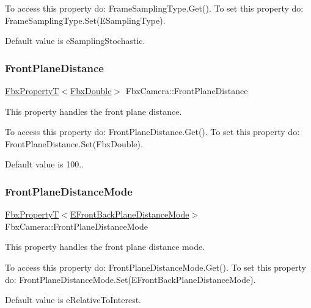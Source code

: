 To access this property do\+: Frame\+Sampling\+Type.\+Get(). To set this property do\+: Frame\+Sampling\+Type.\+Set(\+E\+Sampling\+Type).

Default value is e\+Sampling\+Stochastic. \mbox{\label{class_fbx_camera_ab04e1fdc21ced2af3a372cb3c3c45295}} 
\subsubsection{\texorpdfstring{Front\+Plane\+Distance}{FrontPlaneDistance}}
{\footnotesize\ttfamily \hyperlink{class_fbx_property_t}{Fbx\+PropertyT}$<$\hyperlink{fbxtypes_8h_a171e72a1c46fc15c1a6c9c31948c1c5b}{Fbx\+Double}$>$ Fbx\+Camera\+::\+Front\+Plane\+Distance}

This property handles the front plane distance.

To access this property do\+: Front\+Plane\+Distance.\+Get(). To set this property do\+: Front\+Plane\+Distance.\+Set(\+Fbx\+Double).

Default value is 100.. \mbox{\label{class_fbx_camera_ac8275a3d73371ebdd381bec957820b14}} 
\subsubsection{\texorpdfstring{Front\+Plane\+Distance\+Mode}{FrontPlaneDistanceMode}}
{\footnotesize\ttfamily \hyperlink{class_fbx_property_t}{Fbx\+PropertyT}$<$\hyperlink{class_fbx_camera_a79e74898d117e741c3fbd10b1ef21c79}{E\+Front\+Back\+Plane\+Distance\+Mode}$>$ Fbx\+Camera\+::\+Front\+Plane\+Distance\+Mode}

This property handles the front plane distance mode.

To access this property do\+: Front\+Plane\+Distance\+Mode.\+Get(). To set this property do\+: Front\+Plane\+Distance\+Mode.\+Set(\+E\+Front\+Back\+Plane\+Distance\+Mode).

Default value is e\+Relative\+To\+Interest. \mbox{\label{class_fbx_camera_ad15249c2dceb1d0cc2b5913c0efd9b18}} 
